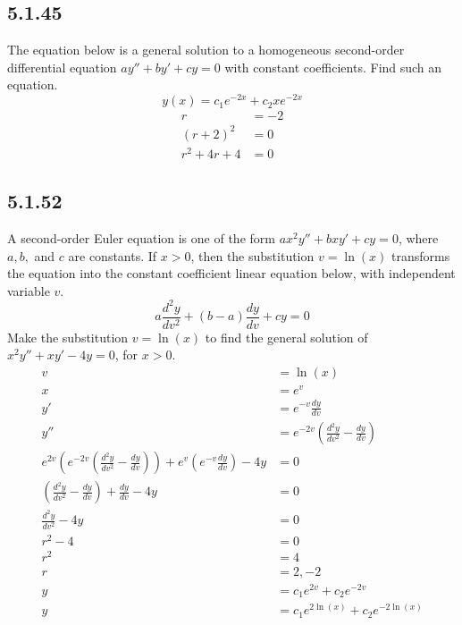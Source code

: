 \documentclass{article}
\begin{document}
\subsection{5.1.45}
The equation below is a general solution to a homogeneous second-order differential equation $ ay'' + by' + cy = 0 $ with constant coefficients. Find such an equation.
$$ y(x) = c_1e^{-2x} + c_2xe^{-2x} $$
\begin{align*}
	r & = -2 \\
	(r + 2)^2 & = 0 \\
	r^2 + 4r + 4 & = 0
\end{align*}

\subsection{5.1.52}
A second-order Euler equation is one of the form $ ax^2y'' + bxy' + cy = 0 $, where $ a, b, $ and $ c $ are constants. If $ x > 0 $, then the substitution $ v = \ln(x) $ transforms the equation into the constant coefficient linear equation below, with independent variable $ v $.
$$ a\frac{d^2y}{dv^2} + (b - a)\frac{dy}{dv} + cy = 0 $$
Make the substitution $ v = \ln(x) $ to find the general solution of $ x^2y'' + xy' -4y = 0 $, for $ x > 0 $.
\begin{align*}
	v & = \ln(x) \\
	x & = e^v \\
	y' & = e^{-v}\frac{dy}{dv} \\
	y'' & = e^{-2v} \left( \frac{d^2y}{dv^2} - \frac{dy}{dv} \right) \\
	e^{2v} \left( e^{-2v} \left( \frac{d^2y}{dv^2} - \frac{dy}{dv} \right) \right) + e^v \left( e^{-v}\frac{dy}{dv} \right) - 4y & = 0 \\
	\left( \frac{d^2y}{dv^2} - \frac{dy}{dv} \right) + \frac{dy}{dv} - 4y & = 0 \\
	\frac{d^2y}{dv^2} - 4y & = 0 \\
	r^2 - 4 & = 0 \\
	r^2 & = 4 \\
	r & = 2, -2 \\
	y & = c_1e^{2v} + c_2e^{-2v} \\
	y & = c_1e^{2\ln(x)} + c_2e^{-2\ln(x)}
\end{align*}
\end{document}
